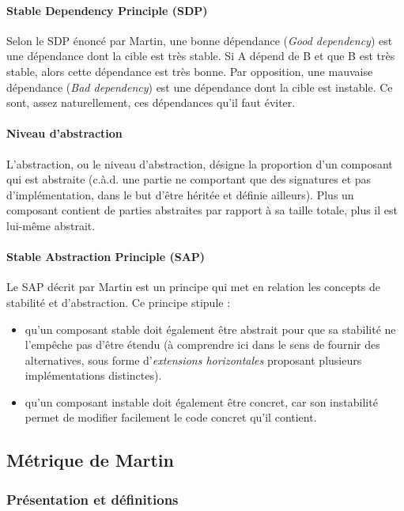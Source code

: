 \documentclass{scrartcl}
\begin{document}
    \paragraph{Stable Dependency Principle (SDP)}Selon le SDP énoncé par Martin\cite{Martin:2003}, une bonne dépendance (\emph{Good dependency}) est une dépendance dont la cible est très stable. Si A dépend de B et que B est très stable, alors cette dépendance est très bonne. Par opposition, une mauvaise dépendance (\emph{Bad dependency}) est une dépendance dont la cible est instable. Ce sont, assez naturellement, ces dépendances qu'il faut éviter.
   
    \paragraph{Niveau d'abstraction}L'abstraction, ou le niveau d'abstraction, désigne la proportion d'un composant qui est abstraite (c.à.d. une partie ne comportant que des signatures et pas d'implémentation, dans le but d'être héritée et définie ailleurs). Plus un composant contient de parties abstraites par rapport à sa taille totale, plus il est lui-même abstrait.
    

    \paragraph{Stable Abstraction Principle (SAP)}Le SAP décrit par Martin\cite{Martin:2003} est un principe qui met en relation les concepts de stabilité et d'abstraction. Ce principe stipule :
    \begin{itemize}
        \item qu'un composant stable doit également être abstrait pour que sa stabilité ne l'empêche pas d'être étendu (à comprendre ici dans le sens de fournir des alternatives, sous forme d'\emph{extensions horizontales} proposant plusieurs implémentations distinctes). 
        \item qu'un composant instable doit également être concret, car son instabilité permet de modifier facilement le code concret qu'il contient.
    \end{itemize}

    
\subsection{Métrique de Martin}
\subsubsection{Présentation et définitions}
\end{document}
